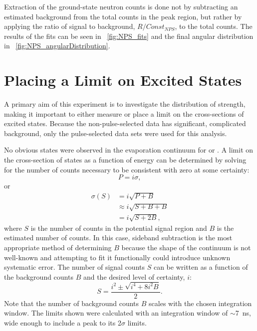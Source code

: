 Extraction of the ground-state neutron counts is done not by subtracting an estimated background from the total counts in the peak region, but rather by applying the ratio of signal to background, $R/Const_{NPS}$, to the total counts.  The results of the fits can be seen in {\fig}~\ref{fig:NPS_fits} and the final angular distribution in {\fig}~\ref{fig:NPS_angularDistribution}.


\section{Placing a Limit on Excited \zp States}

A primary aim of this experiment is to investigate the distribution of \zp strength, making it important to either measure or place a limit on the cross-sections of excited \zp states.  Because the non-pulse-selected data has significant, complicated background, only the pulse-selected data sets were used for this analysis.

No obvious \zp states were observed in the evaporation continuum for  or .  A limit on the cross-section of \zp states as a function of energy can be determined by solving for the number of counts necessary to be consistent with zero at some certainty:
\begin{equation}
P = i\sigma,
\end{equation}
or
\begin{align}
\sigma(S) &= i\sqrt{P+B} \\
               &\approx i\sqrt{S+B+B} \\
               &=i\sqrt{S+2B},
\end{align}
where $S$ is the number of counts in the potential signal region and $B$ is the estimated number of counts.  In this case, sideband subtraction is the most appropriate method of determining $B$ because the shape of the continuum is not well-known and attempting to fit it functionally could introduce unknown systematic error.  The number of signal counts $S$ can be written as a function of the background counts $B$ and the desired level of certainty, $i$:
\begin{equation}
S = \frac{i^2 \pm \sqrt{i^4 + 8i^2B}}{2}.
\end{equation}
Note that the number of background counts $B$ scales with the chosen integration window.  The limits shown were calculated with an integration window of $\sim$7~ns, wide enough to include a peak to its 2$\sigma$ limits.

